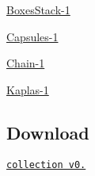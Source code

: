 
\begin{DoxyItemize}
\item \hyperlink{boxesstack1}{Boxes\+Stack-\/1}  
\item \hyperlink{capsules1}{Capsules-\/1}  
\item \hyperlink{chain1}{Chain-\/1}  
\item \hyperlink{kaplas1}{Kaplas-\/1}  
\end{DoxyItemize}\hypertarget{problems_0_2_DownloadProblems}{}\subsection{Download}\label{problems_0_2_DownloadProblems}
\href{https://gforge.inria.fr/frs/download.php/33387/fclib-library-v0.2.tar.gz}{\tt collection v0.} 